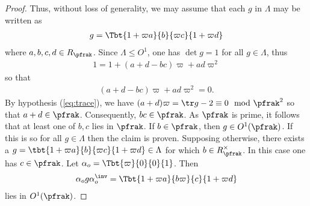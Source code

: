 \begin{proof}
	Thus, without loss of generality, we may assume that each $g$ in $\Lambda$ may be written as
	\begin{align*}
		g = \Tbt{1+\varpi a}{b}{\varpi c}{1+\varpi d}
	\end{align*}
	where $a,b,c,d \in R_\pfrak$.
	Since $\Lambda \leq O^1$, one has $\det g = 1 $ for all $g\in \Lambda$, thus
	\begin{align*}
		1 = 1 + (a+d - bc) \varpi + ad \varpi^2
	\end{align*}
	so that
	\begin{align}\label{eq:MandarinLeyden}
		(a+d - bc) \varpi + ad \varpi^2 =0.
	\end{align}
	By hypothesis (\ref{eq:trace}), we have $(a+d)\varpi = \tr g -2 \equiv 0 \mod \pfrak^2$ so that $a+d \in \pfrak$. Consequently, $bc \in \pfrak$. As $\pfrak$ is prime, it follows that at least one of $b,c$ lies in $\pfrak$. If $b \in \pfrak$, then $g \in O^1(\pfrak)$. If this is so for all $g \in \Lambda$ then the claim is proven. Supposing otherwise, there exists a $g=\tbt{1+\varpi a}{b}{\varpi c}{1+\varpi d} \in \Lambda$ for which $b \in R_\pfrak^\times$. In this case one has $c \in \pfrak$. Let $\alpha_o = \Tbt{\varpi}{0}{0}{1}$. Then
	\begin{align*}
		\alpha_o g\alpha_o^\inv  = \Tbt{1+\varpi a}{b\varpi}{c}{1+\varpi d}
	\end{align*}
	lies in $O^1(\pfrak)$.



\end{proof}
